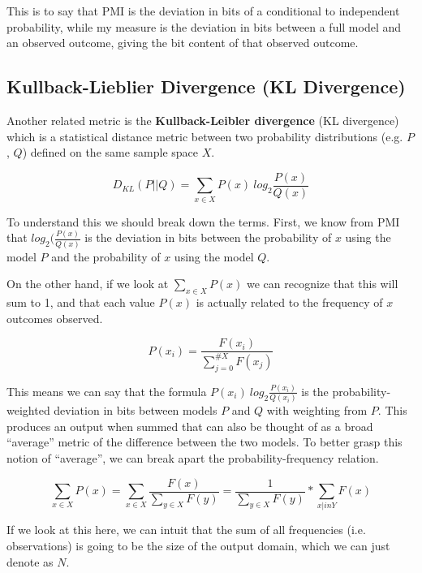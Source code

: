 \documentclass{article}
\begin{document}
This is to say that PMI is the deviation in bits of a conditional to independent probability, while my measure is the deviation in bits between a full model and an observed outcome, giving the bit content of that observed outcome.

\subsection{Kullback-Lieblier Divergence (KL Divergence)}

Another related metric is the \textbf{Kullback-Leibler divergence} (KL divergence) which is a statistical distance metric between two probability distributions (e.g. $P$, $Q$) defined on the same sample space $X$.

\begin{equation}
D_{KL}(P||Q) = \sum_{x \in X}P(x)\ log_2\frac{P(x)}{Q(x)}
\end{equation}

To understand this we should break down the terms. First, we know from PMI that $log_{2}(\frac{P(x)}{Q(x)}$ is the deviation in bits between the probability of $x$ using the model $P$ and the probability of $x$ using the model $Q$. 

On the other hand, if we look at $\sum_{x \in X}P(x)$ we can recognize that this will sum to 1, and that each value $P(x)$ is actually related to the frequency of $x$ outcomes observed.

\begin{equation}
P(x_i) = \frac{F(x_i)}{\sum_{j = 0}^{\# X} F(x_{j})}
\end{equation}

This means we can say that the formula $P(x_i)\ log_2\frac{P(x_i)}{Q(x_i)}$ is the probability-weighted deviation in bits between models $P$ and $Q$ with weighting from $P$. This produces an output when summed that can also be thought of as a broad “average” metric of the difference between the two models. To better grasp this notion of “average”, we can break apart the probability-frequency relation.

\begin{equation}
\sum_{x \in X}P(x) = \sum_{x\in X}\frac{F(x)}{\sum_{y \in X} F(y)}  = \frac{1}{\sum_{y \in X}F(y)} * \sum_{x|in Y} F(x)
\end{equation}

If we look at this here, we can intuit that the sum of all frequencies (i.e. observations) is going to be the size of the output domain, which we can just denote as $N$.
\end{document}
